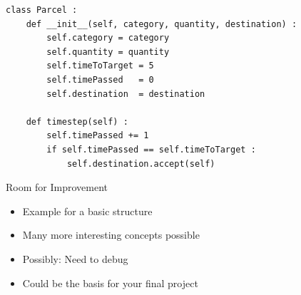 
\begin{frame}[fragile]
%
\begin{codebox}
\begin{verbatim}
class Parcel :
    def __init__(self, category, quantity, destination) :
        self.category = category
        self.quantity = quantity
        self.timeToTarget = 5
        self.timePassed   = 0
        self.destination  = destination
    
    def timestep(self) :
        self.timePassed += 1
        if self.timePassed == self.timeToTarget :
            self.destination.accept(self)
\end{verbatim}
\end{codebox}
%
\end{frame}


\begin{frame}{Room for Improvement}
%
\begin{itemize}
\item Example for a basic structure
\item Many more interesting concepts possible
\item Possibly: Need to debug
\item Could be the basis for your final project
\end{itemize}
%
\end{frame}
